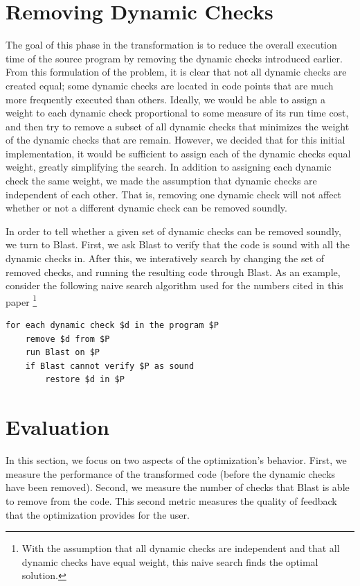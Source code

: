 \documentclass[10pt,letterpaper,twocolumn,english]{article}
\begin{document}
\section{Removing Dynamic Checks}
The goal of this phase in the transformation is to reduce the overall
execution time of the source program by removing the dynamic checks
introduced earlier.  From this formulation of the problem, it is clear
that not all dynamic checks are created equal; some dynamic checks are
located in code points that are much more frequently executed than
others.  Ideally, we would be able to assign a weight to each dynamic
check proportional to some measure of its run time cost, and then try to
remove a subset of all dynamic checks that minimizes the weight of the
dynamic checks that are remain.  However, we decided that for this
initial implementation, it would be sufficient to assign each of the
dynamic checks equal weight, greatly simplifying the search.  In
addition to assigning each dynamic check the same weight, we made the
assumption that dynamic checks are independent of each other.  That is,
removing one dynamic check will not affect whether or not a different
dynamic check can be removed soundly.  

In order to tell whether a given set of dynamic checks can be removed
soundly, we turn to Blast.  First, we ask Blast to verify that the code
is sound with all the dynamic checks in.  After this, we interatively
search by changing the set of removed checks, and running the resulting
code through Blast.  As an example, consider the following naive search
algorithm used for the numbers cited in this paper \footnote{With the
assumption that all dynamic checks are independent and that all dynamic
checks have equal weight, this naive search finds the optimal solution.}

\begin{verbatim}
for each dynamic check $d in the program $P
    remove $d from $P
    run Blast on $P
    if Blast cannot verify $P as sound
        restore $d in $P
\end{verbatim}


\section{Evaluation}

In this section, we focus on two aspects of the optimization's
behavior.  First, we measure the performance of the transformed code
(before the dynamic checks have been removed).  Second, we measure the
number of checks that Blast is able to remove from the code.  This
second metric measures the quality of feedback that the optimization
provides for the user.
\end{document}

